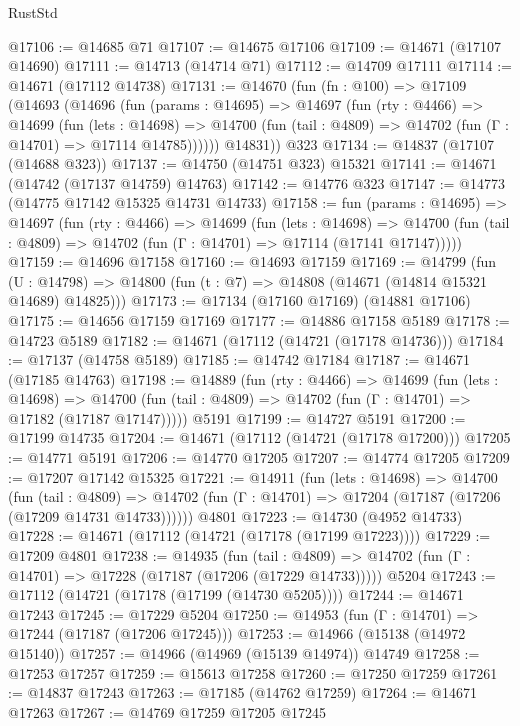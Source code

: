 \begin{lexlean}{RustStd}
\begin{coremodule}
@17106 := @14685 @71
@17107 := @14675 @17106
@17109 := @14671 (@17107 @14690)
@17111 := @14713 (@14714 @71)
@17112 := @14709 @17111
@17114 := @14671 (@17112 @14738)
@17131 := @14670
    (fun (fn : @100) =>
    @17109
      (@14693
        (@14696
          (fun (params : @14695) =>
          @14697
            (fun (rty : @4466) =>
            @14699
              (fun (lets : @14698) =>
              @14700 (fun (tail : @4809) => @14702 (fun (Γ : @14701) => @17114 @14785))))))
        @14831))
    @323
@17134 := @14837 (@17107 (@14688 @323))
@17137 := @14750 (@14751 @323) @15321
@17141 := @14671 (@14742 (@17137 @14759) @14763)
@17142 := @14776 @323
@17147 := @14773 (@14775 @17142 @15325 @14731 @14733)
@17158 := fun (params : @14695) =>
  @14697
    (fun (rty : @4466) =>
    @14699
      (fun (lets : @14698) =>
      @14700 (fun (tail : @4809) => @14702 (fun (Γ : @14701) => @17114 (@17141 @17147)))))
@17159 := @14696 @17158
@17160 := @14693 @17159
@17169 := @14799
    (fun (U : @14798) => @14800 (fun (t : @7) => @14808 (@14671 (@14814 @15321 @14689) @14825)))
@17173 := @17134 (@17160 @17169) (@14881 @17106)
@17175 := @14656 @17159 @17169
@17177 := @14886 @17158 @5189
@17178 := @14723 @5189
@17182 := @14671 (@17112 (@14721 (@17178 @14736)))
@17184 := @17137 (@14758 @5189)
@17185 := @14742 @17184
@17187 := @14671 (@17185 @14763)
@17198 := @14889
    (fun (rty : @4466) =>
    @14699
      (fun (lets : @14698) =>
      @14700 (fun (tail : @4809) => @14702 (fun (Γ : @14701) => @17182 (@17187 @17147)))))
    @5191
@17199 := @14727 @5191
@17200 := @17199 @14735
@17204 := @14671 (@17112 (@14721 (@17178 @17200)))
@17205 := @14771 @5191
@17206 := @14770 @17205
@17207 := @14774 @17205
@17209 := @17207 @17142 @15325
@17221 := @14911
    (fun (lets : @14698) =>
    @14700
      (fun (tail : @4809) =>
      @14702 (fun (Γ : @14701) => @17204 (@17187 (@17206 (@17209 @14731 @14733))))))
    @4801
@17223 := @14730 (@4952 @14733)
@17228 := @14671 (@17112 (@14721 (@17178 (@17199 @17223))))
@17229 := @17209 @4801
@17238 := @14935
    (fun (tail : @4809) => @14702 (fun (Γ : @14701) => @17228 (@17187 (@17206 (@17229 @14733)))))
    @5204
@17243 := @17112 (@14721 (@17178 (@17199 (@14730 @5205))))
@17244 := @14671 @17243
@17245 := @17229 @5204
@17250 := @14953 (fun (Γ : @14701) => @17244 (@17187 (@17206 @17245)))
@17253 := @14966 (@15138 (@14972 @15140))
@17257 := @14966 (@14969 (@15139 @14974)) @14749
@17258 := @17253 @17257
@17259 := @15613 @17258
@17260 := @17250 @17259
@17261 := @14837 @17243
@17263 := @17185 (@14762 @17259)
@17264 := @14671 @17263
@17267 := @14769 @17259 @17205 @17245

\end{coremodule}
\end{lexlean}
